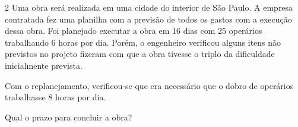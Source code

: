 \begin{escolha}
\begin{boxmedio}
\begin{boxmedio}
{\begin{boxpeq}
\begin{boxpeq}
{\begin{boxpeq}
\begin{boxmedio}
\begin{boxmedio}
\begin{boxpeq}
\begin{boxmedio}
\begin{boxpeq}
\begin{boxpeq}
\begin{boxpeq}
\begin{boxpeq}
\begin{boxmedio}
{\begin{boxmedio}
\begin{boxmedio}
\begin{boxpeq}
\begin{boxmedio}
\begin{boxpeq}
\begin{boxpeq}
\begin{boxpeq}
\begin{escolha}
{\begin{boxmedio}
\begin{boxpeq}
\begin{boxpeq}
\begin{boxpeq}
\begin{boxpeq}
\begin{boxpeq}
\begin{boxmedio}
\begin{boxpeq}
\begin{boxpeq}
\begin{boxpeq}
{\begin{boxpeq}

\num{2} Uma obra será realizada em uma cidade do interior de São Paulo. A
empresa contratada fez uma planilha com a previsão de todos os gastos
com a execução dessa obra. Foi planejado executar a obra em 16 dias com
25 operários trabalhando 6 horas por dia. Porém, o engenheiro verificou
alguns itens não previstos no projeto fizeram com que a obra tivesse o
triplo da dificuldade inicialmente prevista.

Com o replanejamento, verificou-se que era necessário que o dobro de
operários trabalhasse 8 horas por dia.

Qual o prazo para concluir a obra?

\begin{boxmedio}


\end{boxmedio}
\end{boxpeq}}
\end{boxpeq}
\end{boxpeq}
\end{boxpeq}
\end{boxmedio}
\end{boxpeq}
\end{boxpeq}
\end{boxpeq}
\end{boxpeq}
\end{boxpeq}
\end{boxmedio}}
\end{escolha}
\end{boxpeq}
\end{boxpeq}
\end{boxpeq}
\end{boxmedio}
\end{boxpeq}
\end{boxmedio}
\end{boxmedio}}
\end{boxmedio}
\end{boxpeq}
\end{boxpeq}
\end{boxpeq}
\end{boxpeq}
\end{boxmedio}
\end{boxpeq}
\end{boxmedio}
\end{boxmedio}
\end{boxpeq}}
\end{boxpeq}
\end{boxpeq}}
\end{boxmedio}
\end{boxmedio}
\end{escolha}
